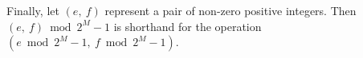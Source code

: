 Finally, let $(e,~f)$ represent a pair of non-zero positive integers. Then $(e,~f) \bmod 2^M-1$ is shorthand for the operation $(e \bmod 2^M-1,~f \bmod 2^M-1)$.









